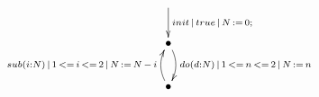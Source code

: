 $\xymatrix{
   \ar[d]^{init\,|\,true\,|\,N\,:=\,0;} \\
   \bullet \ar@/^/[d]^{do(d:N)\,|\,1\,<=\,n\,<=\,2\,|\,N\,:=\,n} \\
   \bullet \ar@/^/[u]^{sub(i:N)\,|\,1\,<=\,i\,<=\,2\,|\,N\,:=\,N\,-\,i}}$
